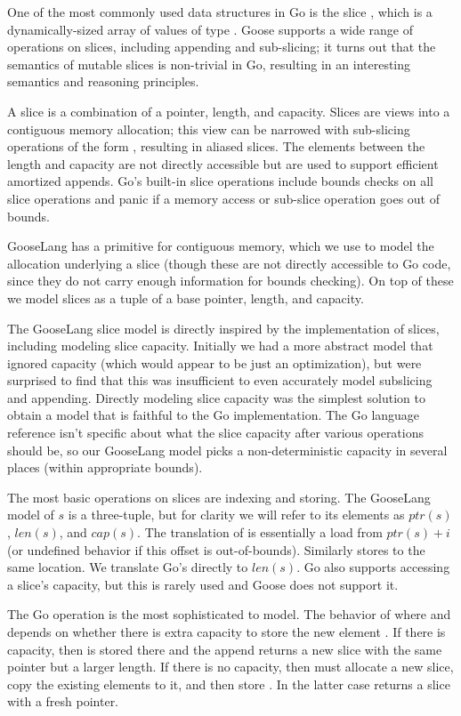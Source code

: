 One of the most commonly used data structures in Go is the slice
, which is a dynamically-sized array of values of type
. Goose supports a wide range of operations on slices,
including appending and sub-slicing; it turns out that the semantics of
mutable slices is non-trivial in Go, resulting in an interesting
semantics and reasoning principles.

A slice is a combination of a pointer, length, and capacity. Slices are
views into a contiguous memory allocation; this view can be narrowed
with sub-slicing operations of the form , resulting
in aliased slices. The elements between the length and capacity are not
directly accessible but are used to support efficient amortized appends.
Go's built-in slice operations include bounds checks on all slice
operations and panic if a memory access or sub-slice operation goes out
of bounds.

GooseLang has a primitive for contiguous memory, which we use to model
the allocation underlying a slice (though these are not directly
accessible to Go code, since they do not carry enough information for
bounds checking). On top of these we model slices as a tuple of a base
pointer, length, and capacity.

The GooseLang slice model is directly inspired by the implementation of
slices, including modeling slice capacity. Initially we had a more
abstract model that ignored capacity (which would appear to be just an
optimization), but were surprised to find that this was insufficient to
even accurately model subslicing and appending. Directly modeling slice
capacity was the simplest solution to obtain a model that is faithful to
the Go implementation. The Go language reference isn't specific about
what the slice capacity after various operations should be, so our
GooseLang model picks a non-deterministic capacity in several places
(within appropriate bounds).

The most basic operations on slices are indexing and storing. The
GooseLang model of $s$ is a three-tuple, but for clarity we will refer
to its elements as $ptr(s)$, $len(s)$, and $cap(s)$. The
translation of  is essentially a load from
$ptr(s) + i$ (or undefined behavior if this offset is out-of-bounds).
Similarly  stores to the same location. We
translate Go's  directly to $len(s)$. Go also supports
accessing a slice's capacity, but this is rarely used and Goose does not
support it.

The Go  operation is the most sophisticated to model. The
behavior of  where  and
 depends on whether there is extra capacity to store the
new element . If there is capacity, then  is stored
there and the append returns a new slice with the same pointer but a
larger length. If there is no capacity, then  must
allocate a new slice, copy the existing elements to it, and then store
. In the latter case  returns a slice with a
fresh pointer.

